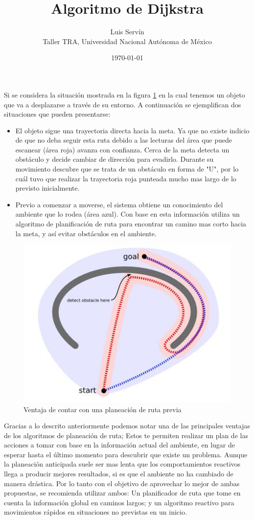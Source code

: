 \documentclass[10pt]{article}
\title{\vspace{-4ex}\textbf{Algoritmo de Dijkstra}\vspace{-2ex}}
\date{\today}
\author{Luis Servín\\ Taller TRA, Universidad Nacional Autónoma de México}
\begin{document}
\maketitle

Si se considera la situación mostrada en la figura \ref{fig:situation1} en la cual tenemos un objeto que va a desplazarse a través de su entorno. A continuación se ejemplifican dos situaciones que pueden presentarse:
\begin{itemize}
	\item El objeto sigue una trayectoria directa hacia la meta. Ya que no existe indicio de que no deba seguir esta ruta debido a las lecturas del área que puede escanear (área roja) avanza con confianza. Cerca de la meta detecta un obstáculo y decide cambiar de dirección para evadirlo. Durante su movimiento descubre que se trata de un obstáculo en forma de "U", por lo cuál tuvo que realizar la trayectoria roja punteada mucho mas largo de lo previsto inicialmente.
	
	\item Previo a comenzar a moverse, el sistema obtiene un conocimiento del ambiente que lo rodea (área azul). Con base en esta información utiliza un algoritmo de planificación de ruta para encontrar un camino mas corto hacia la meta, y así evitar obstáculos en el ambiente.
\end{itemize}

\begin{figure}[h!]
	\centering
	\includegraphics[scale=0.5]{images/situationPathFinding.JPG}
 	\caption{Ventaja de contar con una planeación de ruta previa}
	\label{fig:situation1}
\end{figure}

Gracias a lo descrito anteriormente podemos notar una de las principales ventajas de los algoritmos de planeación de ruta; Estos te permiten realizar un plan de las acciones a tomar con base en la información actual del ambiente, en lugar de esperar hasta el último momento para descubrir que existe un problema. Aunque la planeación anticipada suele ser mas lenta que los comportamientos reactivos llega a producir mejores resultados, si es que el ambiente no ha cambiado de manera drástica. Por lo tanto con el objetivo de aprovechar lo mejor de ambas propuestas, se recomienda utilizar ambos: Un planificador de ruta que tome en cuenta la información global en caminos largos; y un algoritmo reactivo para movimientos rápidos en situaciones no previstas en un inicio.
\end{document}
